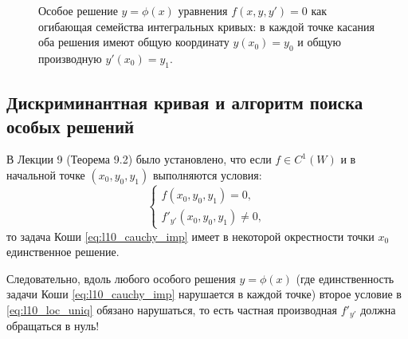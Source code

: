 \begin{figure}[H]
    \centering
    \caption{Особое решение $y = \phi(x)$ уравнения $f(x, y, y') = 0$ как
    огибающая семейства интегральных кривых: в каждой точке касания оба
    решения имеют общую координату $y(x_0) = y_0$ и общую производную
    $y'(x_0) = y_1$.}
\end{figure}

\subsection{Дискриминантная кривая и алгоритм поиска особых решений}

В Лекции 9 (Теорема 9.2) было установлено, что если $f \in C^1(W)$ и в
начальной точке $(x_0, y_0, y_1)$ выполняются условия:
\begin{equation} \label{eq:l10_loc_uniq}
    \begin{cases}
        f(x_0, y_0, y_1) = 0, \\
        f'_{y'}(x_0, y_0, y_1) \neq 0,
    \end{cases} \tag{3}
\end{equation}
то задача Коши \eqref{eq:l10_cauchy_imp} имеет в некоторой окрестности точки
$x_0$ единственное решение.

Следовательно, вдоль любого особого решения $y = \phi(x)$ (где единственность
задачи Коши \eqref{eq:l10_cauchy_imp} нарушается в каждой точке) второе условие
в \eqref{eq:l10_loc_uniq} обязано нарушаться, то есть частная производная
$f'_{y'}$ должна обращаться в нуль!

